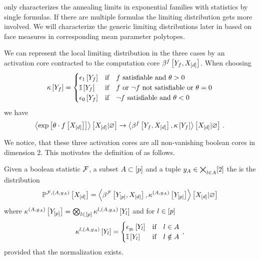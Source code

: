  only characterizes the annealing limits in exponential families with statistics by single formulas.
If there are multiple formulas the limiting distribution gets more involved.
We will characterize the generic limiting distributions later in  based on face measures in corresponding mean parameter polytopes.

We can represent the local limiting distribution in the three cases by an activation core contracted to the computation core $\beta^{f}\left[Y_{f},X_{[d]}\right]$.
When choosing
\begin{align*}
    \kappa\left[Y_{f}\right] =
    \begin{cases}
        \epsilon_{1}\left[Y_{f}\right] & \text{if}\quad \text{$f$ satisfiable and } \theta>0\\
        \mathbb{I}\left[Y_{f}\right] & \text{if}\quad \text{$f$ or $\lnot f$ not satisfiable or } \theta=0 \\
        \epsilon_{0}\left[Y_{f}\right] & \text{if}\quad \text{$\lnot f$ satisfiable and } \theta<0\\
    \end{cases}
\end{align*}
we have
\begin{align*}
    \left\langle \mathrm{exp}\left[\theta\cdot f\left[X_{[d]}\right]\right]\right\rangle \left[ X_{[d]} | \varnothing \right] \rightarrow
    \left\langle \beta^{f}\left[Y_{f},X_{[d]}\right],\kappa\left[Y_{f}\right]\right\rangle \left[ X_{[d]} | \varnothing \right] \, .
\end{align*}

We notice, that these three activation cores are all non-vanishing boolean cores in dimension $2$.
This motivates the definition of \HardLogicNetworks{} as follows.

\begin{definition}[\HardLogicNetwork{}]
    \label{def:hardLogicNetwork}
    Given a boolean statistic $\mathcal{F}$, a subset $A\subset[p]$ and a tuple $y_{A}\in\bigtimes_{l\in A}[2]$ the \HardLogicNetwork{} is the distribution
    \begin{align*}
        \mathbb{P}^{\mathcal{F},(A,y_{A})}\left[X_{[d]}\right]
        = \left\langle \beta^{\mathcal{F}}\left[Y_{[p]},X_{[d]}\right],\kappa^{(A,y_{A})}\left[Y_{[p]}\right]\right\rangle \left[ X_{[d]} | \varnothing \right]
    \end{align*}
    where $\kappa^{(A,y_{A})}\left[Y_{[p]}\right]=\bigotimes_{l\in[p]}\kappa^{l,(A,y_{A})}\left[Y_{l}\right]$ and for $l\in[p]$
    \begin{align*}
        \kappa^{l,(A,y_{A})}\left[Y_{l}\right] =
        \begin{cases}
            \epsilon_{y_{l}}\left[Y_{l}\right] & \text{if}\quad l\in A  \\
            \mathbb{I}\left[Y_{l}\right] & \text{if}\quad l\notin A \\
        \end{cases} \, ,
    \end{align*}
    provided that the normalization exists.
\end{definition}

